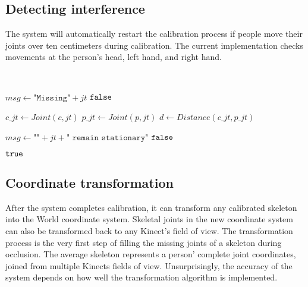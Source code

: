 \subsection{Detecting interference}

The system will automatically restart the calibration process if people move their joints over ten centimeters during calibration. The current implementation checks movements at the person's head, left hand, and right hand.


\begin{algorithm}[ht,width=0.9\columnwidth]
    \caption{$\Function{RemainStationary}(jt, c, p, msg)$}
    \\
    \label{algo:prm}
    \begin{algorithmic}[1]
        \setcounter{ALC@line}{0}
        \vspace*{1mm}

          \STATE $msg \leftarrow \texttt{"Missing"} + jt$
          \RETURN $\False$
        \ENDIF

        \STATE $c\_jt \leftarrow Joint(c, jt)$
        \STATE $p\_jt \leftarrow Joint(p, jt)$
        \STATE $d \leftarrow Distance(c\_jt, p\_jt)$

          \STATE $msg \leftarrow \texttt{""} + jt + \texttt{" remain stationary"}$
          \RETURN $\False$
        \ENDIF

        \RETURN $\True$
    \end{algorithmic}
\end{algorithm}


\subsection{Coordinate transformation}

After the system completes calibration, it can transform any calibrated skeleton into the World coordinate system. Skeletal joints in the new coordinate system can also be transformed back to any Kinect's field of view. The transformation process is the very first step of filling the missing joints of a skeleton during occlusion. The average skeleton represents a person' complete joint coordinates, joined from multiple Kinects fields of view. Unsurprisingly, the accuracy of the system depends on how well the transformation algorithm is implemented.


